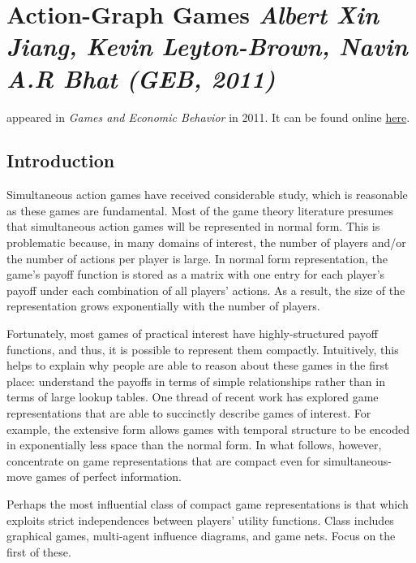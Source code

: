 
\newpage
\section{Action-Graph Games \textit{\small Albert Xin Jiang, Kevin Leyton-Brown, Navin A.R Bhat (GEB, 2011)}}
\citet{AGG-2011} appeared in \emph{Games and Economic Behavior} in 2011. It can be found online \href{https://www.sciencedirect.com/science/article/abs/pii/S0899825610001752}{here}.

\subsection{Introduction}

Simultaneous action games have received considerable study, which is reasonable as these games are fundamental. Most of the game theory literature presumes that simultaneous action games will be represented in normal form. This is problematic because, in many domains of interest, the number of players and/or the number of actions per player is large. In normal form representation, the game's payoff function is stored as a matrix with one entry for each player's payoff under each combination of all players' actions. As a result, the size of the representation grows exponentially with the number of players. 

Fortunately, most games of practical interest have highly-structured payoff functions, and thus, it is possible to represent them compactly. Intuitively, this helps to explain why people are able to reason about these games in the first place: understand the payoffs in terms of simple relationships rather than in terms of large lookup tables. One thread of recent work has explored game representations that are able to succinctly describe games of interest. For example, the extensive form allows games with temporal structure to be encoded in exponentially less space than the normal form. In what follows, however, concentrate on game representations that are compact even for simultaneous-move games of perfect information. 

Perhaps the most influential class of compact game representations is that which exploits strict independences between players' utility functions. Class includes graphical games, multi-agent influence diagrams, and game nets. Focus on the first of these. 

